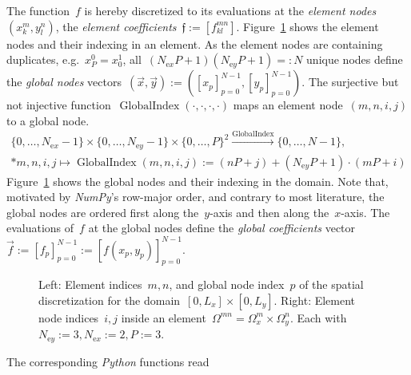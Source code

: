 \documentclass[10pt, ngerman, english,
twoside, open=right,
numbers=noenddot,
declaration=section,
abstract=section,
abstract=multiple,
abstract=notoc,
declaration=notoc,
cd=pale, 
chapterprefix=off, 
chapterpage=false, 
headingsvskip=-10em,
cdgeometry=custom, 
slantedgreek=on,
cdmath=on, 
cdfont=on,
ttfont=false,
mathswap=off,
]{tudscrreprt}
\numberwithin{equation}{chapter}
\newcommand{\sidenote}[1]{
  \leavevmode %
  \marginpar{\hyphenpenalty=1000 \flushleft{\textcolor{HKS41}{#1}}}}
\begin{document}
The function~$f$ is hereby discretized to its evaluations at the \textit{element nodes}~$(x^m_k, y^n_l)$, the \textit{element coefficients}~$\mathfrak{f} := [f^{mn}_{kl}]$. Figure~\ref{fig:SEM_Nodes} shows the element nodes and their indexing in an element. As the element nodes are containing duplicates, e.g.~$x^0_P = x^1_0$, all~$(N_{\text{e}x}P+1)(N_{\text{e}y}P+1)=:N$ unique nodes define the \textit{global nodes} vectors~$(\vec{x}, \vec{y}) := ([x_p]_{p=0}^{N-1}, [y_p]_{p=0}^{N-1})$. The surjective but not injective function~$\operatorname{GlobalIndex}(\cdot, \cdot, \cdot, \cdot)$ maps an element node~$(m,n,i,j)$ to a global node.
\begin{equation}
\begin{gathered}
\{0,\ldots,N_{\text{e}x}-1\} \times \{0,\ldots,N_{\text{e}y}-1\} \times \{0,\ldots,P\}^2 \overset{\operatorname{GlobalIndex}}{\longrightarrow} \{0,\ldots,N-1\},\\*
m,n,i,j \mapsto \operatorname{GlobalIndex}(m,n,i,j):=(nP+j)+(N_{\text{e}y}P+1)\cdot(mP+i) 
\end{gathered} \label{eq:SEM_map}
\end{equation}
Figure~\ref{fig:SEM_Nodes} shows the global nodes and their indexing in the domain. Note that, motivated by \textit{NumPy}'s row-major order, and contrary to most literature, the global nodes are ordered first along the~$y$-axis and then along the~$x$-axis. The evaluations of~$f$ at the global nodes define the \textit{global coefficients} vector~$\vec{f} := [f_p]_{p=0}^{N-1} := [f(x_p,y_p)]_{p=0}^{N-1}$.\par
\begin{figure}[h]
\centering
\begin{minipage}[c]{0.55\textwidth}

\end{minipage}
\hfill
\begin{minipage}[c]{0.4\textwidth}

\end{minipage}
\caption{Left: Element indices~$m, n$, and global node index~$p$ of the spatial discretization for the domain~$[0, L_x]\times[0,L_y]$. Right: Element node indices~$i,j$ inside an element~$\Omega^{mn} = \Omega_x^m \times \Omega_y^n$. Each with~$N_{\text{e}y} := 3, N_{\text{e}x} := 2, P:=3$.}\label{fig:SEM_Nodes}
\end{figure}
\sidenote{\textit{Python} Functions}The corresponding \textit{Python} functions read
\end{document}
